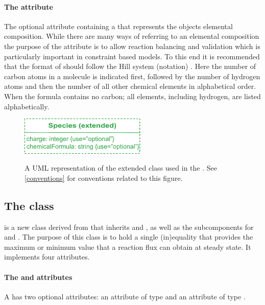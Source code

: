 \paragraph{The  attribute}
\label{chemicalFormula-attribute}
The optional attribute  containing a
 that represents the \Species objects elemental
composition.
%
%
While there are many ways of referring to an elemental composition the
purpose of the  attribute is to allow reaction
balancing and validation which is particularly important in constraint based
models. To this end it is recommended that the format of
 should follow the Hill system (notation) \cite{hillsystem, hillwikipedia}. Here
the number of carbon atoms in a molecule is indicated first, followed by
the number of hydrogen atoms and then the number of all other chemical elements
in alphabetical order. When the formula contains no carbon; all elements,
including hydrogen, are listed alphabetically. 
%
\begin{figure}[h]
  \centering
  \includegraphics[width=6cm]{images/fbc_uml_species.pdf}\\
  \caption{A UML representation of the extended \SBML \Species class used in
  the \FBCPackage. See \ref{conventions} for conventions related to this
  figure.}
  \label{fig:fbc_uml_species}
\end{figure}


\subsection{The \FBC {} class}
\label{fluxbound-class}

\FluxBound is a new \FBC class derived from \SBML \SBase that inherits
 and , as well as the subcomponents for
\Annotation and \Notes. The purpose of this class is to hold a single
(in)equality that provides the maximum or minimum value that a reaction flux
can obtain at steady state. It implements four attributes.

\paragraph{The  and  attributes}
A \FluxBound has two optional attributes:  an attribute of type
 and  an attribute of type .

